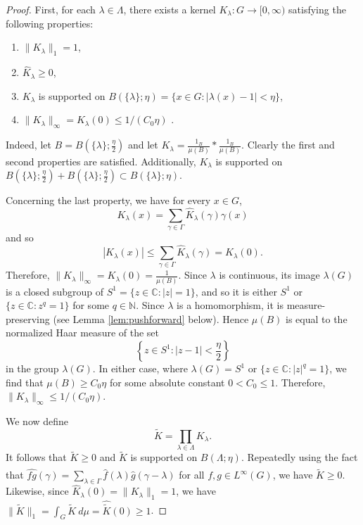 \documentclass[10pt]{article}
\theoremstyle{definition}
\newcommand{\C}{\mathbb{C}}
\newcommand{\N}{\mathbb{N}}
\begin{document}
\begin{proof}
    First, for each $\lambda \in \Lambda$, there exists a kernel $K_{\lambda}: G \to [0, \infty)$ satisfying the following properties:
\begin{enumerate}
\item $\lVert K_{\lambda} \rVert_1 = 1$,
\item $\widehat{K}_{\lambda} \geq 0$,
\item $K_{\lambda}$ is supported on $B(\{\lambda\}; \eta) = \{x \in G: |\lambda(x) - 1| < \eta\}$,
\item $\|K_\lambda\|_{\infty} = K_{\lambda}(0) \leq 1/(C_0 \eta)$ .
\end{enumerate}		
Indeed, let $B = B(\{\lambda\}; \frac{\eta}{2})$ and let $K_{\lambda} = \frac{1_B}{\mu(B)}*\frac{1_B}{\mu(B)}$. Clearly the first and second properties are satisfied. Additionally, $K_{\lambda}$ is supported on $B(\{\lambda\}; \frac{\eta}{2}) + B(\{\lambda\}; \frac{\eta}{2}) \subset B(\{\lambda\}; \eta)$. 

Concerning the last property, we have for every $x \in G$,
\[
    K_{\lambda}(x) = \sum_{\gamma \in \Gamma} \widehat{K}_{\lambda}(\gamma) \gamma(x)
\]
and so
\[
    \left| K_{\lambda}(x) \right| \leq \sum_{\gamma \in \Gamma} \widehat{K}_{\lambda}(\gamma) = K_{\lambda}(0).
\]
Therefore, $\lVert K_{\lambda} \rVert_{\infty} = K_{\lambda}(0) = \frac{1}{\mu(B)}$.
Since $\lambda$ is continuous, its image $\lambda(G)$ is a closed subgroup of $S^1 = \{ z \in \C: |z|=1\}$, and so it is either $S^1$ or $\{ z \in \C : z^q=1\}$ for some $q \in \N$. Since $\lambda$ is a homomorphism, it is measure-preserving (see Lemma \ref{lem:pushforward} below). Hence $\mu(B)$ is equal to the normalized Haar measure of the set
\[
\left\{ z \in S^1 : |z-1| < \frac{\eta}{2} \right\}
\]
in the group $\lambda(G)$. In either case, where $\lambda(G)=S^1$ or $\{ z \in \C : |z|^q=1\}$, we find that $\mu(B) \geq C_0 \eta$ for some absolute constant $0 < C_0 \leq 1$. Therefore, $\lVert K_{\lambda} \rVert_{\infty} \leq 1/(C_0 \eta)$.  
	
We now define
    \[
        \widetilde{K} = \prod_{\lambda \in \Lambda} K_{\lambda}.
    \]
    It follows that $\widetilde{K} \geq 0$ and $\widetilde{K}$ is supported on $B(\Lambda; \eta)$. Repeatedly using the fact that $\widehat{fg}(\gamma) = \sum_{\lambda \in \Gamma} \widehat{f}(\lambda) \widehat{g}(\gamma - \lambda)$ for all $f, g \in L^{\infty}(G)$, we have $\widehat{\widetilde{K}} \geq 0$. Likewise, since $\widehat{K}_{\lambda}(0) = \lVert K_{\lambda} \rVert_1 = 1$, we have $\lVert \widetilde{K} \rVert_1 = \int_G \widetilde{K} \ d \mu =  \widehat{\widetilde{K}}(0) \geq 1$.
    

\end{proof}
\end{document}
